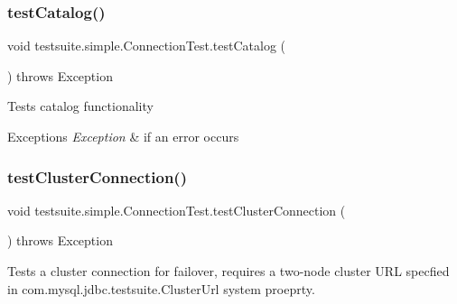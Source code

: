 \subsubsection{\texorpdfstring{test\+Catalog()}{testCatalog()}}
{\footnotesize\ttfamily void testsuite.\+simple.\+Connection\+Test.\+test\+Catalog (\begin{DoxyParamCaption}{ }\end{DoxyParamCaption}) throws Exception}

Tests catalog functionality


\begin{DoxyExceptions}{Exceptions}
{\em Exception} & if an error occurs \\
\hline
\end{DoxyExceptions}
\mbox{\label{classtestsuite_1_1simple_1_1_connection_test_a898cfadb7bf3141e3a364a0d47c824fc}} 
\subsubsection{\texorpdfstring{test\+Cluster\+Connection()}{testClusterConnection()}}
{\footnotesize\ttfamily void testsuite.\+simple.\+Connection\+Test.\+test\+Cluster\+Connection (\begin{DoxyParamCaption}{ }\end{DoxyParamCaption}) throws Exception}

Tests a cluster connection for failover, requires a two-\/node cluster U\+RL specfied in com.\+mysql.\+jdbc.\+testsuite.\+Cluster\+Url system proeprty.


